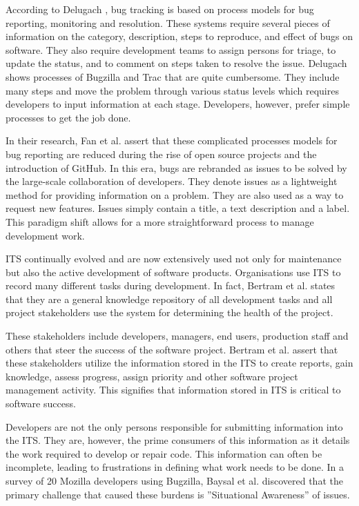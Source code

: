 \documentclass{mproj}
\begin{document}
According to Delugach \cite{Delugach:2007}, bug tracking is based on process models for bug reporting, monitoring and resolution. These systems require several pieces of information on the category, description, steps to reproduce, and effect of bugs on software. They also require development teams to assign persons for triage, to update the status, and to comment on steps taken to resolve the issue. Delugach shows processes of Bugzilla and Trac that are quite cumbersome. They include many steps and move the problem through various status levels which requires developers to input information at each stage. Developers, however, prefer simple processes to get the job done.

In their research, Fan et al. \cite{Fan:2017} assert that these complicated processes models for bug reporting are reduced during the rise of open source projects and the introduction of GitHub. In this era, bugs are rebranded as issues to be solved by the large-scale collaboration of developers. They denote issues as a lightweight method for providing information on a problem. They are also used as a way to request new features. Issues simply contain a title, a text description and a label. This paradigm shift allows for a more straightforward process to manage development work.

ITS continually evolved and are now extensively used not only for maintenance but also the active development of software products. Organisations use ITS to record many different tasks during development. In fact, Bertram et al. \cite{Bertram:2010} states that they are a general knowledge repository of all development tasks and all project stakeholders use the system for determining the health of the project.

These stakeholders include developers, managers, end users, production staff and others that steer the success of the software project. Bertram et al. \cite{Bertram:2010} assert that these stakeholders utilize the information stored in the ITS to create reports, gain knowledge, assess progress, assign priority and other software project management activity. This signifies that information stored in ITS is critical to software success.

Developers are not the only persons responsible for submitting information into the ITS. They are, however, the prime consumers of this information as it details the work required to develop or repair code. This information can often be incomplete, leading to frustrations in defining what work needs to be done. In a survey of 20 Mozilla developers using Bugzilla, Baysal et al. \cite{Baysal:2013} discovered that the primary challenge that caused these burdens is ”Situational Awareness” of issues.
\end{document}
